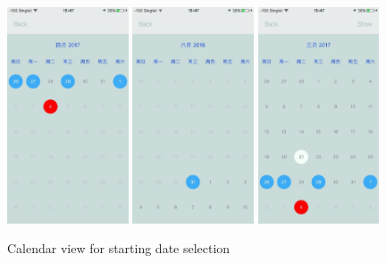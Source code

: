 \documentclass[12pt,a4paper]{article}
\begin{document}
                \begin{figure}
                    \includegraphics[width=0.32\textwidth]{4-1-6-d-real}
                    \includegraphics[width=0.32\textwidth]{4-1-6-e-real}
                    \includegraphics[width=0.32\textwidth]{4-1-6-f-real}
                    \centering
                    \caption{Calendar view for starting date selection}
                    \label{fig:calendar}
                \end{figure}
                
\end{document}
